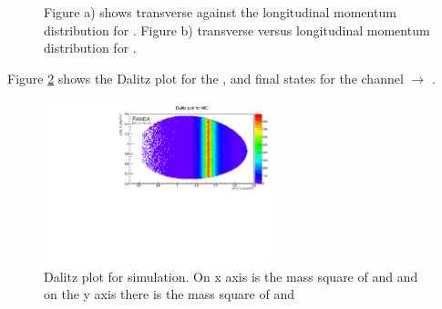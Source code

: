 \begin{figure}
	\caption{\propose Figure a) shows transverse against the longitudinal momentum distribution for \anticascade. Figure b) 
			transverse versus longitudinal momentum distribution for \excitedcascade.}
	\label{fig:MC_xi_pt_vs_pz}
\end{figure}

Figure \ref{fig:eventgeneration_Dalitz} shows the Dalitz plot for the \lam, \kminus and \anticascade final states for 
the channel \pbarpSystem $\rightarrow$ \excitedcascade \anticascade. 

\begin{figure}
	\centering
	\includegraphics[width=0.6\textwidth]{./plots/Dalitzplot_MC.pdf}
	\caption{\propose Dalitz plot for simulation. On x axis is the mass square of \lam  and \kminus and on the y axis there is the mass square of \anticascade and \kminus}
	\label{fig:eventgeneration_Dalitz}
\end{figure}

